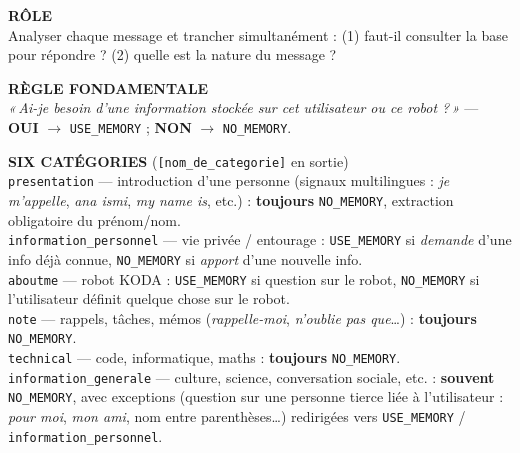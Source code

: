 \documentclass[a4paper,12pt]{report}
\begin{document}
	\vspace{0.5em}
	
	\begin{tcolorbox}[
		colback=gray!6,
		colframe=kodablock,
		fonttitle=\bfseries\small,
		title={Prompt — Analyseur de Dépendance Mémoire (synthèse)},
		arc=3mm,
		boxrule=0.6pt,
		left=6pt, right=6pt, top=6pt, bottom=6pt
		]
		\small
		
		\textbf{RÔLE} \\
		Analyser chaque message et trancher simultanément : (1) faut-il consulter la
		base pour répondre ? (2) quelle est la nature du message ?
		
		\vspace{0.35em}
		\textbf{RÈGLE FONDAMENTALE} \\
		\textit{«\,Ai-je besoin d'une information stockée sur cet utilisateur ou ce
			robot ?\,»} — \textbf{OUI} $\rightarrow$ \texttt{USE\_MEMORY} ; \textbf{NON}
		$\rightarrow$ \texttt{NO\_MEMORY}.
		
		\vspace{0.35em}
		\textbf{SIX CATÉGORIES} (\texttt{[nom\_de\_categorie]} en sortie) \\
		\texttt{presentation} — introduction d'une personne (signaux multilingues :
		\textit{je m'appelle}, \textit{ana ismi}, \textit{my name is}, etc.) :
		\textbf{toujours} \texttt{NO\_MEMORY}, extraction obligatoire du prénom/nom. \\
		\texttt{information\_personnel} — vie privée / entourage : \texttt{USE\_MEMORY}
		si \textit{demande} d'une info déjà connue, \texttt{NO\_MEMORY} si \textit{apport}
		d'une nouvelle info. \\
		\texttt{aboutme} — robot KODA : \texttt{USE\_MEMORY} si question sur le robot,
		\texttt{NO\_MEMORY} si l'utilisateur définit quelque chose sur le robot. \\
		\texttt{note} — rappels, tâches, mémos (\textit{rappelle-moi}, \textit{n'oublie
			pas que}\ldots) : \textbf{toujours} \texttt{NO\_MEMORY}. \\
		\texttt{technical} — code, informatique, maths : \textbf{toujours}
		\texttt{NO\_MEMORY}. \\
		\texttt{information\_generale} — culture, science, conversation sociale, etc. :
		\textbf{souvent} \texttt{NO\_MEMORY}, avec exceptions (question sur une personne
		tierce liée à l'utilisateur : \textit{pour moi}, \textit{mon ami}, nom entre
		parenthèses\ldots) redirigées vers \texttt{USE\_MEMORY} /
		\texttt{information\_personnel}.
		

\end{tcolorbox}
\end{document}
